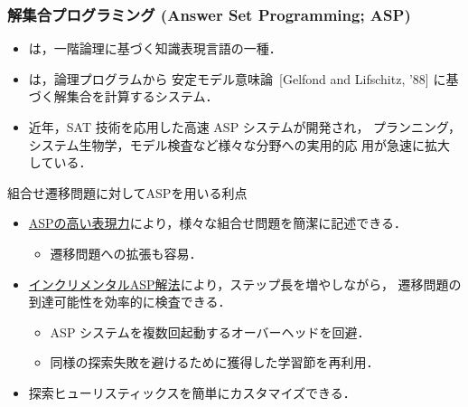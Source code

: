 \documentclass[dvipdfmx,11pt]{beamer}
\begin{document}
\begin{frame}
  \frametitle{解集合プログラミング {\large(Answer Set Programming; ASP)}}
  \begin{itemize}
  \item {}は，一階論理に基づく知識表現言語の一種．
  \item {}は，論理プログラムから
    安定モデル意味論~{\scriptsize[Gelfond and Lifschitz, '88]}
    に基づく解集合を計算するシステム．
  \item 近年，SAT 技術を応用した高速 ASP システムが開発され，
    プランニング，システム生物学，モデル検査など様々な分野への実用的応
    用が急速に拡大している．
  \end{itemize}

  \begin{alertblock}{組合せ遷移問題に対してASPを用いる利点}
    \begin{itemize}
    \item \underline{ASPの高い表現力}により，様々な組合せ問題を簡潔に記述できる．
      \begin{itemize}
      \item 遷移問題への拡張も容易．
      \end{itemize}
    \item \underline{インクリメンタルASP解法}により，ステップ長を増やしながら，
      遷移問題の到達可能性を効率的に検査できる．
      \begin{itemize}
      \item ASP システムを複数回起動するオーバーヘッドを回避．
      \item 同様の探索失敗を避けるために獲得した学習節を再利用．
      \end{itemize}
    \item 探索ヒューリスティックスを簡単にカスタマイズできる．
    \end{itemize}
  \end{alertblock}
\end{frame}
\end{document}
